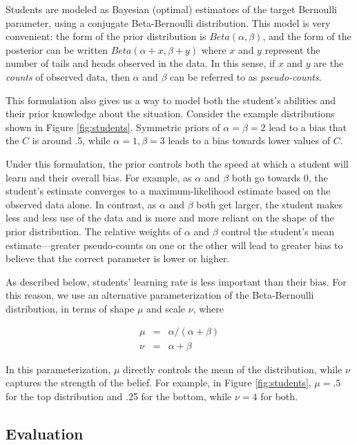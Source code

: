 \documentclass[10pt,letterpaper]{article}
\begin{document}
Students are modeled as Bayesian (optimal) estimators of the target Bernoulli parameter, using a conjugate Beta-Bernoulli distribution. This model is very convenient: the form of the prior distribution is $Beta(\alpha,\beta)$, and the form of the posterior can be written $Beta(\alpha+x,\beta+y)$ where $x$ and $y$ represent the number of tails and heads observed in the data. In this sense, if $x$ and $y$ are the \emph{counts} of observed data, then $\alpha$ and $\beta$ can be referred to as \emph{pseudo-counts}.

This formulation also gives us a way to model both the student's abilities and their prior knowledge about the situation. Consider the example distributions shown in Figure \ref{fig:students}. Symmetric priors of $\alpha=\beta=2$ lead to a bias that the $C$ is around .5, while $\alpha=1, \beta=3$ leads to a bias towards lower values of $C$. 

Under this formulation, the prior controls both the speed at which a student will learn and their overall bias. For example, as $\alpha$ and $\beta$ both go towards 0, the student's estimate converges to a maximum-likelihood estimate based on the observed data alone. In contrast, as $\alpha$ and $\beta$ both get larger, the student makes less and less use of the data and is more and more reliant on the shape of the prior distribution. The relative weights of $\alpha$ and $\beta$ control the student's mean estimate---greater pseudo-counts on one or the other will lead to greater bias to believe that the correct parameter is lower or higher. 

As described below, students' learning rate is less important than their bias. For this reason, we use an alternative parameterization of the Beta-Bernoulli distribution, in terms of shape $\mu$ and scale $\nu$, where

\begin{eqnarray}
\mu &=&  \alpha / (\alpha + \beta) \\
\nu &=& \alpha + \beta
\end{eqnarray}

\noindent In this parameterization, $\mu$ directly controls the mean of the distribution, while $\nu$ captures the strength of the belief. For example, in Figure \ref{fig:students}, $\mu=.5$ for the top distribution and .25 for the bottom, while $\nu=4$ for both.

\subsection{Evaluation}
\end{document}
